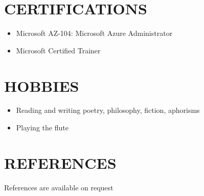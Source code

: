 \documentclass[margin, 10pt]{res} %
\begin{document}
\begin{resume}
\section{CERTIFICATIONS}
\begin{itemize}
\item Microsoft AZ-104: Microsoft Azure Administrator 
\item Microsoft Certified Trainer
\end{itemize}
\section{HOBBIES}
\begin{itemize}
\item Reading and writing poetry, philosophy, fiction, aphorisms
\item Playing the flute
\end{itemize}
\section{REFERENCES}
References are available on request


\end{resume}
\end{document}
